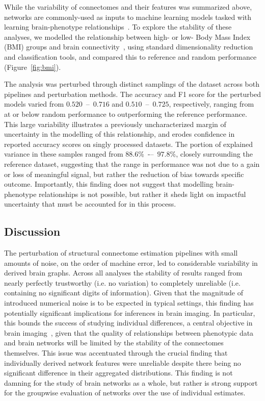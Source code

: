 \documentclass[fleqn,10pt]{SelfArx} %
\begin{document}
While the variability of connectomes and their features was summarized above, networks are commonly-used as inputs to
machine learning models tasked with learning brain-phenotype relationships~\cite{Dubois2016-yr}. To explore the
stability of these analyses, we modelled the relationship between high- or low- Body Mass Index (BMI) groups and brain
connectivity~\cite{Park2015-uj,Gupta2015-ap}, using standard dimensionality reduction and classification tools, and
compared this to reference and random performance (Figure~\ref{fig:bmi}).

The analysis was perturbed through distinct samplings of the dataset across both pipelines and perturbation methods.
The accuracy and F1 score for the perturbed models varied from $0.520$~–~$0.716$ and $0.510$~–~$0.725$, respectively,
ranging from at or below random performance to outperforming the reference performance. This large variability
illustrates a previously uncharacterized margin of uncertainty in the modelling of this relationship, and erodes
confidence in reported accuracy scores on singly processed datasets. The portion of explained variance in these samples
ranged from $88.6\%$~-–~$97.8\%$, closely surrounding the reference dataset, suggesting that the range in performance
was not due to a gain or loss of meaningful signal, but rather the reduction of bias towards specific outcome.
Importantly, this finding does not suggest that modelling brain-phenotype relationships is not possible, but rather it
sheds light on impactful uncertainty that must be accounted for in this process.

\subsection*{Discussion}

The perturbation of structural connectome estimation pipelines with small amounts of noise, on the order of machine
error, led to considerable variability in derived brain graphs. Across all analyses the stability of results ranged
from nearly perfectly trustworthy (i.e. no variation) to completely unreliable (i.e. containing no significant digits
of information). Given that the magnitude of introduced numerical noise is to be expected in typical settings, this
finding has potentially significant implications for inferences in brain imaging. In particular, this bounds the
success of studying individual differences, a central objective in brain imaging~\cite{Dubois2016-yr}, given that the
quality of relationships between phenotypic data and brain networks will be limited by the stability of the
connectomes themselves. This issue was accentuated through the crucial finding that individually derived network
features were unreliable despite there being no significant difference in their aggregated distributions. This finding
is not damning for the study of brain networks as a whole, but rather is strong support for the groupwise evaluation of
networks over the use of individual estimates.
\end{document}
